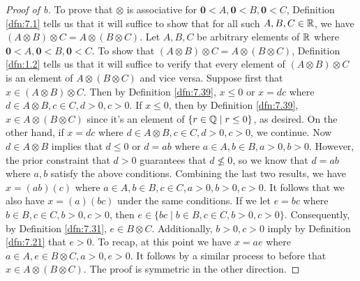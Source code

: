 \documentclass[../main.tex]{subfiles}
\begin{document}
\begin{exercise}
\begin{proof}[Proof of b]
        To prove that $\otimes$ is associative for $\bm{0}<A,\bm{0}<B,\bm{0}<C$, Definition \ref{dfn:7.1} tells us that it will suffice to show that for all such $A,B,C\in\mathbb{R}$, we have $(A\otimes B)\otimes C=A\otimes(B\otimes C)$. Let $A,B,C$ be arbitrary elements of $\mathbb{R}$ where $\bm{0}<A,\bm{0}<B,\bm{0}<C$. To show that $(A\otimes B)\otimes C=A\otimes(B\otimes C)$, Definition \ref{dfn:1.2} tells us that it will suffice to verify that every element of $(A\otimes B)\otimes C$ is an element of $A\otimes(B\otimes C)$ and vice versa. Suppose first that $x\in(A\otimes B)\otimes C$. Then by Definition \ref{dfn:7.39}, $x\leq 0$ or $x=dc$ where $d\in A\otimes B,c\in C,d>0,c>0$. If $x\leq 0$, then by Definition \ref{dfn:7.39}, $x\in A\otimes(B\otimes C)$ since it's an element of $\{r\in\mathbb{Q}\mid r\leq 0\}$, as desired. On the other hand, if $x=dc$ where $d\in A\otimes B,c\in C,d>0,c>0$, we continue. Now $d\in A\otimes B$ implies that $d\leq 0$ or $d=ab$ where $a\in A,b\in B,a>0,b>0$. However, the prior constraint that $d>0$ guarantees that $d\nleq 0$, so we know that $d=ab$ where $a,b$ satisfy the above conditions. Combining the last two results, we have $x=(ab)(c)$ where $a\in A,b\in B,c\in C,a>0,b>0,c>0$. It follows that we also have $x=(a)(bc)$ under the same conditions. If we let $e=bc$ where $b\in B,c\in C,b>0,c>0$, then $e\in\{bc\mid b\in B,c\in C,b>0,c>0\}$. Consequently, by Definition \ref{dfn:7.31}, $e\in B\otimes C$. Additionally, $b>0,c>0$ imply by Definition \ref{dfn:7.21} that $e>0$. To recap, at this point we have $x=ae$ where $a\in A,e\in B\otimes C,a>0,e>0$. It follows by a similar process to before that $x\in A\otimes(B\otimes C)$. The proof is symmetric in the other direction.

\end{proof}
\end{exercise}
\end{document}
